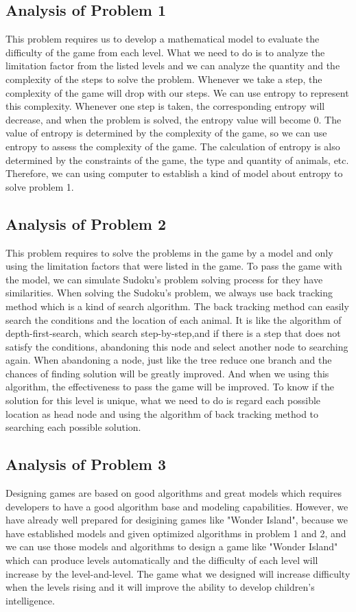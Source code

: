 \subsection{Analysis of Problem 1}

This problem requires us to develop a mathematical model to evaluate the difficulty of the game from each level. What we need to do is to analyze the limitation factor from the listed levels and we can analyze the quantity and the complexity of the steps to solve the problem. Whenever we take a step, the complexity of the game will drop with our steps. We can use entropy to represent this complexity. Whenever one step is taken, the corresponding entropy will decrease, and when the problem is solved, the entropy value will become 0.  The value of entropy is determined by the complexity of the game, so we can use entropy to assess the complexity of the game. The calculation of entropy is also determined by the constraints of the game, the type and quantity of animals, etc. Therefore, we can using computer to establish a kind of model about entropy to solve problem 1.

\subsection{Analysis of Problem 2}
This problem requires to solve the problems in the game by a model and only using the limitation factors that were listed in the game. To pass the game with the model, we can simulate Sudoku's problem solving process for they have similarities. When solving the Sudoku's problem, we always use back tracking method which is a kind of search algorithm.  The back tracking method can easily search the conditions and the location of each animal. It is like the algorithm of depth-first-search, which search step-by-step,and if there is a step that does not satisfy the conditions, abandoning this node and select another node to searching again. When abandoning a node, just like the tree  reduce one branch and the chances of finding solution will be greatly improved. And when we using this algorithm, the effectiveness to pass the game will  be improved. To know if the solution for this level is unique, what we need to do is regard each possible location as head node and using the algorithm of back tracking method to searching each possible solution.

\subsection{Analysis of Problem 3}
Designing games are based on good algorithms and great models which requires developers to have a good algorithm base and modeling capabilities. However, we have already well prepared for desigining games like "Wonder Island", because we have established models and given optimized algorithms in problem 1 and 2, and we can use those models and algorithms to design a game like "Wonder Island" which can produce levels automatically and the difficulty of each level will increase by the level-and-level. The game what we designed will  increase difficulty when the levels rising and it will  improve the ability to develop children's intelligence.

